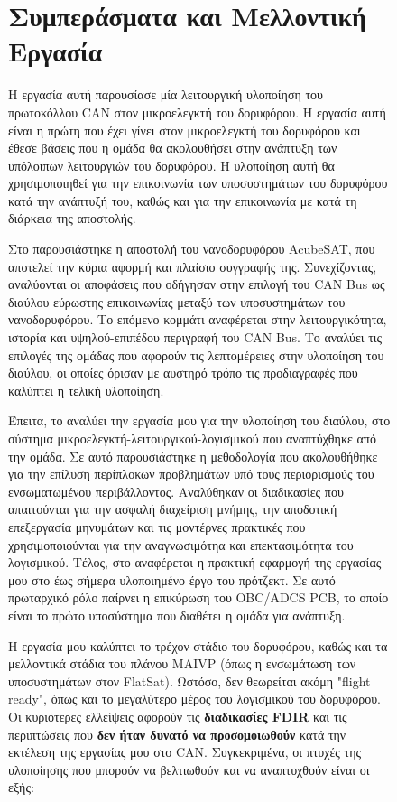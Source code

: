 \documentclass[a4paper,nobib,justified]{tufte-book}
\begin{document}
\begin{figure}
\chapter{Συμπεράσματα και Μελλοντική Εργασία}
\label{future-work}
Η εργασία αυτή παρουσίασε μία λειτουργική υλοποίηση του πρωτοκόλλου CAN στον μικροελεγκτή του δορυφόρου. Η εργασία αυτή είναι η πρώτη που έχει γίνει στον μικροελεγκτή του δορυφόρου και έθεσε βάσεις που η ομάδα θα ακολουθήσει στην ανάπτυξη των υπόλοιπων λειτουργιών του δορυφόρου. Η υλοποίηση αυτή θα χρησιμοποιηθεί για την επικοινωνία των υποσυστημάτων του δορυφόρου κατά την ανάπτυξή του, καθώς και για την επικοινωνία με κατά τη διάρκεια της αποστολής.

Στο  παρουσιάστηκε η αποστολή του νανοδορυφόρου AcubeSAT, που αποτελεί την κύρια αφορμή και πλαίσιο συγγραφής της. Συνεχίζοντας, αναλύονται οι αποφάσεις που οδήγησαν στην επιλογή του CAN Bus ως διαύλου εύρωστης επικοινωνίας μεταξύ των υποσυστημάτων του νανοδορυφόρου. Το επόμενο κομμάτι αναφέρεται στην λειτουργικότητα, ιστορία και υψηλού-επιπέδου περιγραφή του CAN Bus. Το  αναλύει τις επιλογές της ομάδας που αφορούν τις λεπτομέρειες στην υλοποίηση του διαύλου, οι οποίες όρισαν με αυστηρό τρόπο τις προδιαγραφές που καλύπτει η τελική υλοποίηση.

\par Έπειτα, το  αναλύει την εργασία μου για την υλοποίηση του διαύλου, στο σύστημα μικροελεγκτή-λειτουργικού-λογισμικού που αναπτύχθηκε από την ομάδα. Σε αυτό παρουσιάστηκε η μεθοδολογία που ακολουθήθηκε για την επίλυση περίπλοκων προβλημάτων υπό τους περιορισμούς του ενσωματωμένου περιβάλλοντος. Αναλύθηκαν οι διαδικασίες που απαιτούνται για την ασφαλή διαχείριση μνήμης, την αποδοτική επεξεργασία μηνυμάτων και τις μοντέρνες πρακτικές που χρησιμοποιούνται για την αναγνωσιμότηα και επεκτασιμότητα του λογισμικού. Τέλος, στο  αναφέρεται η πρακτική εφαρμογή της εργασίας μου στο έως σήμερα υλοποιημένο έργο του πρότζεκτ. Σε αυτό πρωταρχικό ρόλο παίρνει η επικύρωση του OBC/ADCS PCB, το οποίο είναι το πρώτο υποσύστημα που διαθέτει η ομάδα για ανάπτυξη.

Η εργασία μου καλύπτει το τρέχον στάδιο του δορυφόρου, καθώς και τα μελλοντικά στάδια του πλάνου MAIVP  (όπως η ενσωμάτωση των υποσυστημάτων στον FlatSat). Ωστόσο, δεν θεωρείται ακόμη "flight ready", όπως και το μεγαλύτερο μέρος του λογισμικού του δορυφόρου. Οι κυριότερες ελλείψεις αφορούν τις \textbf{διαδικασίες FDIR} και τις περιπτώσεις που \textbf{δεν ήταν δυνατό να προσομοιωθούν} κατά την εκτέλεση της εργασίας μου στο CAN. Συγκεκριμένα, οι πτυχές της υλοποίησης που μπορούν να βελτιωθούν και να αναπτυχθούν είναι οι εξής:


\end{figure}
\end{document}
